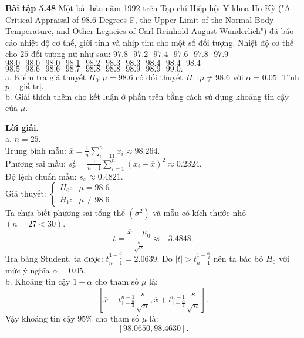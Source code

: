 \begin{mybox}
\textbf{Bài tập 5.48} Một bài báo năm 1992 trên Tạp chí Hiệp hội Y khoa Ho Kỳ ("A Critical Appraisal of $98.6$ Degrees F, the Upper Limit of the Normal Body Temperature, and Other Legacies of Carl Reinhold August Wunderlich") đã báo cáo nhiệt độ cơ thể, giới tính và nhịp tim cho một số đối tượng. Nhiệt độ cơ thể cho $25$ đối tượng nữ như sau: $97.8 \text{ } 97.2 \text{ } 97.4 \text{ } 97.6 \text{ } 97.8 \text{ } 97.9 \text{ }$  $98.0 \text{ } 98.0 \text{ } 98.0 \text{ } 98.1 \text{ } 98.2 \text{ } 98.3 \text{ } 98.3 \text{ } 98.4 \text{ } 98.4 \text{ } 98.4 \text{ }$ $98.5 \text{ } 98.6 \text{ } 98.6 \text{ } 98.7 \text{ } 98.8 \text{ } 98.8 \text{ } 98.9 \text{ } 98.9 \text{ } 99.0.$\\
a. Kiểm tra giả thuyết $H_0: \mu = 98.6$ có đối thuyết $H_1: \mu \ne 98.6$ với $\alpha = 0.05.$ Tính $p-\text{giá trị}.$\\
b. Giải thích thêm cho kết luận ở phần trên bằng cách sử dụng khoảng tin cậy của $\mu.$
\end{mybox}
\textbf{Lời giải.} \\
a. $n = 25.$\\
Trung bình mẫu:
$\overline x  = \frac{1}{n}\sum\limits_{i =1 1}^n {{x_i}}  \approx 98.264.$\\
Phương sai mẫu: $s_x^2 = \frac{1}{{n - 1}}\sum\limits_{i = 1}^n {{{\left( {{x_i} - \overline x } \right)}^2}}  \approx 0.2324.$\\
Độ lệch chuẩn mẫu: ${s_x} \approx 0.4821.$\\
Giả thuyết: $\begin{cases}
H_0: \text{ } \mu = 98.6\\
H_1: \text{ } \mu \ne 98.6
\end{cases} $ \\
Ta chưa biết phương sai tổng thể $\left( {\sigma^2} \right)$ và mẫu có kích thước nhỏ $\left( {n = 27 < 30} \right).$
$$t = \frac{\overline{x} - \mu_0}{\frac{s}{\sqrt{n}}} \approx -3.4848.$$
Tra bảng Student, ta được: $t_{n - 1}^{1 - \frac{\alpha}{2}} = 2.0639.$
Do $\left| t \right| > t_{n - 1}^{1 - \frac{\alpha}{2}}$ nên ta bác bỏ $H_0$ với mức ý nghĩa $\alpha = 0.05.$\\
b. Khoảng tin cậy $1 - \alpha$ cho tham số $\mu$ là:
$$\left[ {\overline x  - t_{1 - \frac{\alpha }{2}}^{n - 1}\frac{s}{{\sqrt n }},\overline x  + t_{1 - \frac{\alpha }{2}}^{n - 1}\frac{s}{{\sqrt n }}} \right].$$
Vậy khoảng tin cậy $95\%$ cho tham số $\mu$ là:
$$\left[ {98.0650, 98.4630} \right].$$

